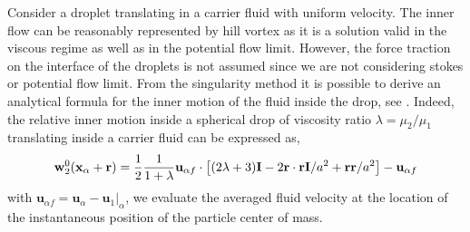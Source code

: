 Consider a droplet translating in a carrier fluid with uniform velocity.
The inner flow can be reasonably represented by hill vortex as it is a solution valid in the viscous regime as well as in the potential flow limit.  
However, the force traction on the interface of the droplets  is not assumed since we are not considering stokes or potential flow limit. 
From the singularity method it is possible to derive an analytical formula for the inner motion of the fluid inside the drop, see \citet[Chapter 7.]{pozrikidis1992boundary}. 
Indeed, the relative inner motion inside a spherical drop of viscosity ratio $\lambda = \mu_2/\mu_1$ translating inside a carrier fluid can be expressed as,
\begin{equation}
    \textbf{w}_2^0(\textbf{x}_\alpha + \textbf{r}) = 
    \frac{1}{2}\frac{1}{1+\lambda} \textbf{u}_{\alpha f}\cdot \left[
        (2\lambda+3)\textbf{I}
        - 2 \textbf{r}\cdot \textbf{r} \textbf{I}/a^2
        + \textbf{rr}/a^2
    \right] - \textbf{u}_{\alpha f}\\
    \label{eq:wa_def}
\end{equation}
with $\textbf{u}_{\alpha f} = \textbf{u}_\alpha - \textbf{u}_1|_\alpha$, we evaluate the averaged fluid velocity at the location of the instantaneous position of the particle center of mass. 
